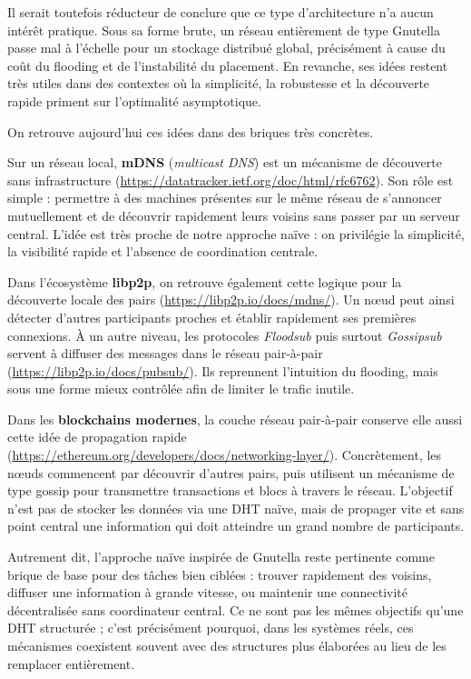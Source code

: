 Il serait toutefois réducteur de conclure que ce type d'architecture n'a aucun intérêt pratique. Sous sa forme brute, un réseau entièrement de type Gnutella passe mal à l'échelle pour un stockage distribué global, précisément à cause du coût du flooding et de l'instabilité du placement. En revanche, ses idées restent très utiles dans des contextes où la simplicité, la robustesse et la découverte rapide priment sur l'optimalité asymptotique.

On retrouve aujourd'hui ces idées dans des briques très concrètes.

Sur un réseau local, \textbf{mDNS} (\textit{multicast DNS}) est un mécanisme de découverte sans infrastructure (\url{https://datatracker.ietf.org/doc/html/rfc6762}). Son rôle est simple : permettre à des machines présentes sur le même réseau de s'annoncer mutuellement et de découvrir rapidement leurs voisins sans passer par un serveur central. L'idée est très proche de notre approche naïve : on privilégie la simplicité, la visibilité rapide et l'absence de coordination centrale.

Dans l'écosystème \textbf{libp2p}, on retrouve également cette logique pour la découverte locale des pairs (\url{https://libp2p.io/docs/mdns/}). Un n\oe ud peut ainsi détecter d'autres participants proches et établir rapidement ses premières connexions. À un autre niveau, les protocoles \textit{Floodsub} puis surtout \textit{Gossipsub} servent à diffuser des messages dans le réseau pair-à-pair (\url{https://libp2p.io/docs/pubsub/}). Ils reprennent l'intuition du flooding, mais sous une forme mieux contrôlée afin de limiter le trafic inutile.

Dans les \textbf{blockchains modernes}, la couche réseau pair-à-pair conserve elle aussi cette idée de propagation rapide (\url{https://ethereum.org/developers/docs/networking-layer/}). Concrètement, les n\oe uds commencent par découvrir d'autres pairs, puis utilisent un mécanisme de type gossip pour transmettre transactions et blocs à travers le réseau. L'objectif n'est pas de stocker les données via une DHT naïve, mais de propager vite et sans point central une information qui doit atteindre un grand nombre de participants.

Autrement dit, l'approche naïve inspirée de Gnutella reste pertinente comme brique de base pour des tâches bien ciblées : trouver rapidement des voisins, diffuser une information à grande vitesse, ou maintenir une connectivité décentralisée sans coordinateur central. Ce ne sont pas les mêmes objectifs qu'une DHT structurée ; c'est précisément pourquoi, dans les systèmes réels, ces mécanismes coexistent souvent avec des structures plus élaborées au lieu de les remplacer entièrement.

